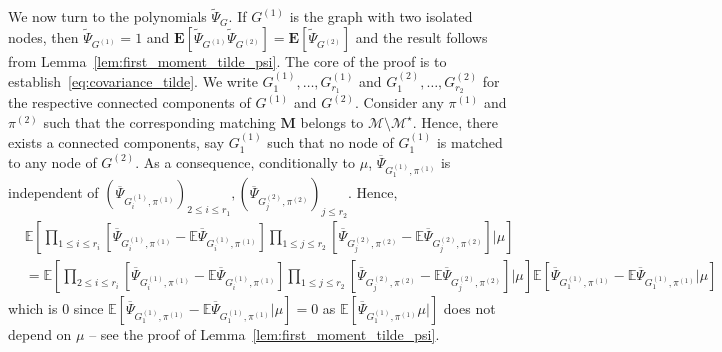 \documentclass{article}
\begin{document}
    \medskip 
    We now turn to the polynomials $\widetilde{\Psi}_G$. If $G^{(1)}$ is the graph with two isolated nodes, then $\widetilde{\Psi}_{G^{(1)}}=1$ and $\mathbf{E}[\widetilde{\Psi}_{G^{(1)}}\widetilde{\Psi}_{G^{(2)}}]=\mathbf{E}[\widetilde{\Psi}_{G^{(2)}}]$ and the result follows from Lemma~\ref{lem:first_moment_tilde_psi}. 
    The core of the proof is to establish~\eqref{eq:covariance_tilde}. 
    We write $G^{(1)}_1,\ldots, G^{(1)}_{r_1}$ and $G^{(2)}_1,\ldots, G^{(2)}_{r_2}$ for the respective connected components of $G^{(1)}$ and $G^{(2)}$. Consider any $\pi^{(1)}$ and $\pi^{(2)}$ such that the corresponding matching $\mathbf{M}$ belongs to $\mathcal{M}\setminus \mathcal{M}^{\star}$. Hence, there exists a connected components, say $G^{(1)}_1$ such that no node of $G^{(1)}_1$ is matched to any node of $G^{(2)}$. As a consequence, conditionally to $\mu$, $\overline{\Psi}_{G^{(1)}_1, \pi^{(1)}}$ is independent of $(\overline{\Psi}_{G^{(1)}_i, \pi^{(1)}})_{2 \leq i \leq r_1}, (\overline{\Psi}_{G^{(2)}_j, \pi^{(2)}})_{j \leq r_2}$. Hence, 
        \begin{align*}
        &\mathbb{E}\left[\prod_{1\leq i\leq r_i}\left[\overline{\Psi}_{G^{(1)}_i, \pi^{(1)}} - \mathbb E \overline{\Psi}_{G^{(1)}_i, \pi^{(1)}}\right]\prod_{1\leq j\leq r_2} \left[\overline{\Psi}_{G^{(2)}_j, \pi^{(2)}} - \mathbb E\overline{\Psi}_{G^{(2)}_j, \pi^{(2)}}\right]\Big|\mu\right]\\
        &= \mathbb{E}\left[\prod_{2\leq i\leq r_i}\left[\overline{\Psi}_{G^{(1)}_i, \pi^{(1)}} - \mathbb E \overline{\Psi}_{G^{(1)}_i, \pi^{(1)}}\right]\prod_{1\leq j\leq r_2} \left[\overline{\Psi}_{G^{(2)}_j, \pi^{(2)}} - \mathbb E\overline{\Psi}_{G^{(2)}_j, \pi^{(2)}}\right]\Big|\mu\right] \mathbb{E}\left[\overline{\Psi}_{G^{(1)}_1, \pi^{(1)}} - \mathbb E \overline{\Psi}_{G^{(1)}_1, \pi^{(1)}}\Big|\mu\right]
    \end{align*}
    which is $0$ since $\mathbb{E}[\overline{\Psi}_{G^{(1)}_1, \pi^{(1)}} - \mathbb E \overline{\Psi}_{G^{(1)}_1, \pi^{(1)}}|\mu] = 0$ as $\mathbb E[ \overline{\Psi}_{G^{(1)}_1, \pi^{(1)}}\mu|]$ does not depend on $\mu$ -- see the proof of Lemma~\ref{lem:first_moment_tilde_psi}. 
    
\end{document}
